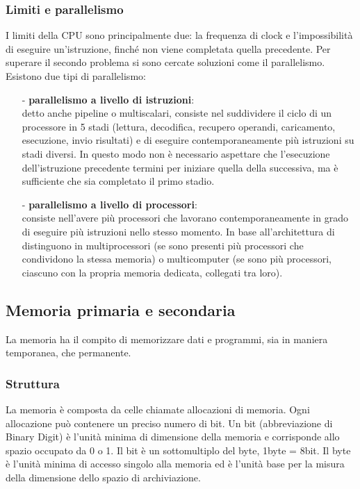 \documentclass[a4paper]{article}
\begin{document}
\subsubsection*{Limiti e parallelismo}
I limiti della CPU sono principalmente due: la frequenza di clock e l'impossibilità di eseguire un'istruzione, finché
non viene completata quella precedente. Per superare il secondo problema si sono cercate soluzioni come il parallelismo.
Esistono due tipi di parallelismo:
\begin{itemize}[topsep=3pt, itemsep=0pt]
	\item[-] \textbf{parallelismo a livello di istruzioni}: \\ 
	detto anche pipeline o multiscalari, consiste nel suddividere il ciclo di un processore in 5 stadi (lettura, decodifica,
	recupero operandi, caricamento, esecuzione, invio risultati) e di eseguire contemporaneamente più istruzioni su stadi
	diversi. In questo modo non è necessario aspettare che l'esecuzione dell'istruzione	precedente termini per iniziare
	quella della successiva, ma è sufficiente che sia completato il primo stadio. 
	\item[-] \textbf{parallelismo a livello di processori}: \\
	consiste nell'avere più processori che lavorano contemporaneamente in grado di eseguire più istruzioni nello stesso momento.
	In base all'architettura di distinguono in multiprocessori (se sono presenti più processori che condividono la stessa memoria)
	o multicomputer (se sono più processori, ciascuno con la propria memoria dedicata, collegati tra loro).
\end{itemize}

\subsection{Memoria primaria e secondaria}
La memoria ha il compito di memorizzare dati e programmi, sia in maniera temporanea, che permanente.

\subsubsection*{Struttura}
La memoria è composta da celle chiamate allocazioni di memoria. Ogni allocazione può contenere un preciso numero di bit.
Un bit (abbreviazione di Binary Digit) è l'unità minima di dimensione della memoria e corrisponde allo spazio occupato da 0 o 1.
Il bit è un sottomultiplo del byte, 1byte = 8bit. Il byte è l'unità minima di accesso singolo alla memoria ed è l'unità base 
per la misura della dimensione dello spazio di archiviazione.
\end{document}
